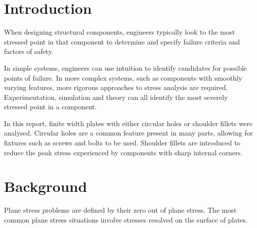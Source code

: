 \documentclass[a4paper,11pt,twocolumn]{article}
\newcommand{\MPa}{\si{\mega\pascal}\xspace}
\begin{document}
\nomenclature[C6]{$\sigma_i$}{Stress at gauge $i$
    \hspace*{\fill}\MPa}
\nomenclature[CC]{}{\vspace{-\baselineskip}}

\printnomenclature

\section{Introduction}

When designing structural components, engineers typically look to the most
stressed point in that component to determine and specify failure criteria and
factors of safety.

In simple systems, engineers can use intuition to identify candidates for
possible points of failure. In more complex systems, such as components
with smoothly varying features, more rigorous approaches to stress analysis 
are required. Experimentation, simulation and theory can all identify the most 
severely stressed point in a component.

In this report, finite width plates with either circular holes or shoulder
fillets were analysed. Circular holes are a common feature present in many
parts, allowing for fixtures such as screws and bolts to be used. Shoulder
fillets are introduced to reduce the peak stress experienced by components with
sharp internal corners.

\section{Background}

Plane stress problems are defined by their zero out of plane stress. The most 
common plane stress situations involve stresses resolved on the surface of 
plates.
\end{document}
